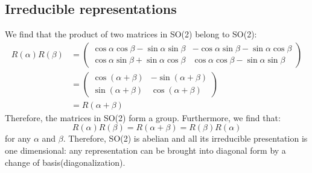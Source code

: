 \documentclass{amsart}
\theoremstyle{remark}
\theoremstyle{remark}
\theoremstyle{definition}
\begin{document}
\vspace{10pt}
\subsection{Irreducible representations}

We find that the product of two matrices in SO(2) belong to SO(2):
\begin{align*}
    R(\alpha) R(\beta) &= \left(\begin{matrix}
        \cos\alpha\cos\beta - \sin\alpha\sin\beta & -\cos\alpha\sin\beta - \sin\alpha\cos\beta \\ 
        \cos\alpha\sin\beta + \sin\alpha\cos\beta & \cos\alpha\cos\beta - \sin\alpha\sin\beta
    \end{matrix}\right) \\
    &= \left(\begin{matrix}
        \cos(\alpha + \beta) & -\sin(\alpha + \beta) \\ \sin(\alpha + \beta) & \cos(\alpha + \beta)
    \end{matrix}\right) \\
    &= R(\alpha + \beta)
\end{align*}
Therefore, the matrices in SO(2) form a group. Furthermore, we find that:
\begin{equation*}
    R(\alpha) R(\beta) = R(\alpha + \beta) = R(\beta)R(\alpha) 
\end{equation*}
for any $\alpha$ and $\beta$. Therefore, SO(2) is abelian and all its irreducible presentation 
is one dimensional: any representation can be brought into diagonal form by a change 
of basis(diagonalization).

\vspace{10pt}
\end{document}
